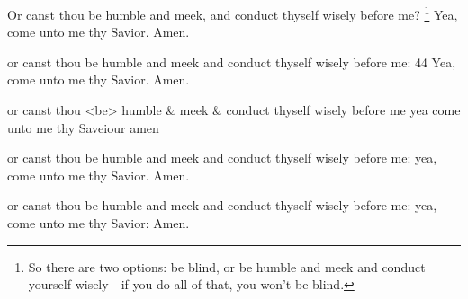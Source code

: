 		Or canst thou be humble and meek, and conduct thyself wisely before me?%
			\footnote{%
				So there are two options: be blind, or be humble and meek and conduct yourself wisely---if you do all of that, you won't be blind.
				}
		Yea, come unto me thy Savior. Amen.

		\begin{framed}
		\scriptsize
			\begin{compactdesc}
				\item[JSP] or canst thou be humble and meek and conduct thyself wisely before me: 44 Yea, come unto me thy Savior. Amen.
				\item[RB1] or canst thou <be> humble \& meek \& conduct thyself wisely before me yea come unto me thy Saveiour amen
				\item[DC 1835] or canst thou be humble and meek and conduct thyself wisely before me: yea, come unto me thy Savior. Amen.
				\item[DC 1844] or canst thou be humble and meek and conduct thyself wisely before me: yea, come unto me thy Savior: Amen.
			\end{compactdesc}
		\end{framed}
